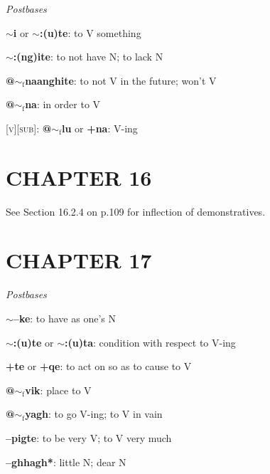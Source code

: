 \documentclass{article}
\begin{document}
\textit{Postbases}
\begin{description}
\item \textbf{$\sim$i} or \textbf{$\sim$:(u)te}: to V something
\item \textbf{$\sim$:(ng)ite}: to not have N; to lack N
\item \textbf{@$\sim_\text{f}$naanghite}: to not V in the future; won't V
\item \textbf{@$\sim_\text{f}$na}: in order to V
\end{description}

\bigskip

\textsc{[v][sub]}: \textbf{@$\sim_\text{f}$lu} or \textbf{+na}: V-ing


\section*{CHAPTER 16}

See Section 16.2.4 on p.109 for inflection of demonstratives.


\section*{CHAPTER 17}

\textit{Postbases}
\begin{description}
\item \textbf{$\sim$--ke}: to have as one's N
\item \textbf{$\sim$:(u)te} or \textbf{$\sim$:(u)ta}: condition with respect to V-ing
\item \textbf{+te} or \textbf{+qe}: to act on so as to cause to V
\item \textbf{@$\sim_\text{f}$vik}: place to V
\item \textbf{@$\sim_\text{f}$yagh}: to go V-ing; to V in vain
\item \textbf{--pigte}: to be very V; to V very much
\item \textbf{--ghhagh*}: little N; dear N
\end{description}
\end{document}
